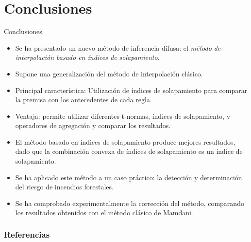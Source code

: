 \documentclass{beamer}
\begin{document}
\section{Conclusiones}
\begin{frame}{Conclusiones}
	\begin{itemize}
	\item Se ha presentado un nuevo método de inferencia difusa: el \emph{método de interpolación basado en índices de solapamiento}.
	\item Supone una generalización del método de interpolación clásico.
	\item Principal característica: Utilización de índices de solapamiento para comparar la premisa con los antecedentes de cada regla.
	\item Ventaja: permite utilizar diferentes t-normas, índices de solapamiento, y operadores de agregación y comparar los resultados.
	\item El método basado en índices de solapamiento produce mejores resultados, dado que la combinación convexa de índices de solapamiento es un índice de solapamiento.
	\item Se ha aplicado este método a un caso práctico: la detección y determinación del riesgo de incendios forestales.
	\item Se ha comprobado experimentalmente la corrección del método, comparando los resultados obtenidos con el método clásico de Mamdani.
	\end{itemize}
\end{frame}

\begin{frame}
	\frametitle{Referencias}
   { }
    
\end{frame}
\end{document}
